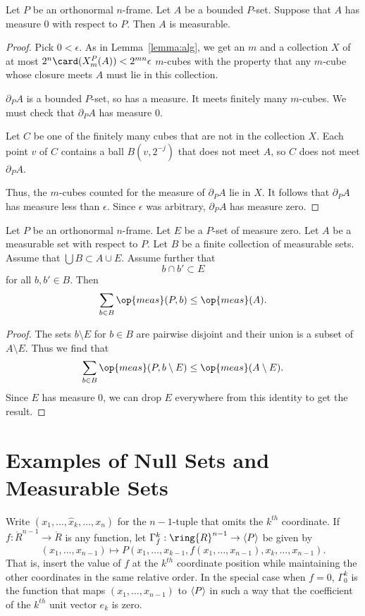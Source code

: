 \begin{lemma}  Let $P$ be an orthonormal $n$-frame.  Let $A$ be a bounded $P$-set.
Suppose that $A$ has measure $0$ with respect to $P$.  Then $A$ is
measurable.
\end{lemma}

\begin{proof} Pick $0 <\epsilon$.
As in Lemma~\ref{lemma:alg}, we get an $m$ and a collection $X$ of
at most $2^n \card(X^P_m(A)) < 2^{m n}\epsilon$ $m$-cubes with the
property that any $m$-cube whose closure meets $A$ must lie in this
collection.

$\partial_P A$ is a bounded $P$-set, so has a measure.  It meets
finitely many $m$-cubes.  We must check that $\partial_P A$ has
measure $0$.

Let $C$ be one of the finitely many cubes that are not in the
collection $X$.  Each point $v$ of $C$ contains a ball $B(v,2^{-j})$
that does not meet $A$, so $C$ does not meet $\partial_P A$.

Thus, the $m$-cubes counted for the measure of $\partial_P A$ lie in
$X$.  It follows that $\partial_P A$ has measure less than
$\epsilon$.  Since $\epsilon$ was arbitrary, $\partial_P A$ has
measure zero.
\end{proof}




\begin{lemma}  Let $P$ be an orthonormal $n$-frame.
Let $E$ be a $P$-set of measure zero.  Let $A$ be a measurable set
with respect to $P$.  Let $B$ be a finite collection of measurable
sets. Assume that $\bigcup B \subset A \cup E$.  Assume further that
    $$b \cap b' \subset E$$
for all $b,b'\in B$.  Then
    $$\sum_{b\in B} \op{meas}(P,b) \le \op{meas}(A).$$
\end{lemma}

\begin{proof}
The sets $b\setminus E$ for $b\in B$ are pairwise disjoint and their
union is a subset of $A\setminus E$.  Thus we find that
    $$\sum_{b\in B}\op{meas}(P,b\setminus E) \le \op{meas}(A\setminus
    E).$$
Since $E$ has measure $0$, we can drop $E$ everywhere from this
identity to get the result.
\end{proof}

\section{Examples of Null Sets and Measurable Sets}

Write $(x_1,\ldots,\hat x_k,\ldots,x_n)$ for the $n-1$-tuple that
omits the $k^{th}$ coordinate. If $f:\ring{R}^{n-1}\to\ring{R}$ is
any function, let $\Gamma^k_f:\ring{R}^{n-1}\to\aspan{P}$ be given
by
    $$
    (x_1,\ldots,x_{n-1}) \mapsto
    P(x_1,\ldots,x_{k-1},f(x_1,\ldots,x_{n-1}),x_k,\ldots,x_{n-1}).$$
That is, insert the value of $f$ at the $k^{th}$ coordinate position
while maintaining the other coordinates in the same relative order.
In the special case when $f=0$, $\Gamma^k_0$ is the function that
maps $(x_1,\ldots,x_{n-1})$ to ${\langle P\rangle}$ in such a way that the
coefficient of the $k^{th}$ unit vector $e_k$ is zero.

